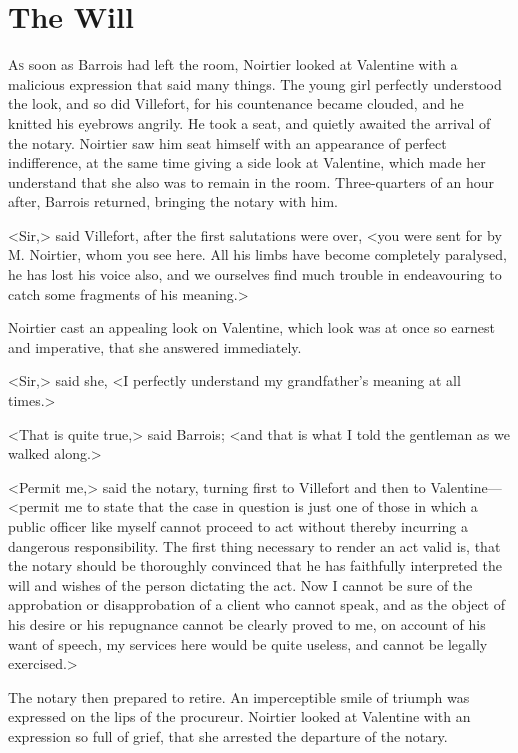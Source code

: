\chapter{The Will} 

 \lettrine{A}{s} soon as Barrois had left the room, Noirtier looked at Valentine with a malicious expression that said many things. The young girl perfectly understood the look, and so did Villefort, for his countenance became clouded, and he knitted his eyebrows angrily. He took a seat, and quietly awaited the arrival of the notary. Noirtier saw him seat himself with an appearance of perfect indifference, at the same time giving a side look at Valentine, which made her understand that she also was to remain in the room. Three-quarters of an hour after, Barrois returned, bringing the notary with him. 

 <Sir,> said Villefort, after the first salutations were over, <you were sent for by M. Noirtier, whom you see here. All his limbs have become completely paralysed, he has lost his voice also, and we ourselves find much trouble in endeavouring to catch some fragments of his meaning.> 

 Noirtier cast an appealing look on Valentine, which look was at once so earnest and imperative, that she answered immediately. 

 <Sir,> said she, <I perfectly understand my grandfather's meaning at all times.> 

 <That is quite true,> said Barrois; <and that is what I told the gentleman as we walked along.> 

 <Permit me,> said the notary, turning first to Villefort and then to Valentine—<permit me to state that the case in question is just one of those in which a public officer like myself cannot proceed to act without thereby incurring a dangerous responsibility. The first thing necessary to render an act valid is, that the notary should be thoroughly convinced that he has faithfully interpreted the will and wishes of the person dictating the act. Now I cannot be sure of the approbation or disapprobation of a client who cannot speak, and as the object of his desire or his repugnance cannot be clearly proved to me, on account of his want of speech, my services here would be quite useless, and cannot be legally exercised.> 

 The notary then prepared to retire. An imperceptible smile of triumph was expressed on the lips of the procureur. Noirtier looked at Valentine with an expression so full of grief, that she arrested the departure of the notary. 

